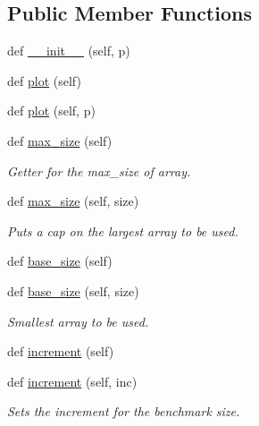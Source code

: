 \subsection*{Public Member Functions}
\begin{DoxyCompactItemize}
\item 
def \hyperlink{classbridges_1_1sorting__benchmark_1_1_sorting_benchmark_a703f01c41d21cf5127eeff8918a4adbd}{\+\_\+\+\_\+init\+\_\+\+\_\+} (self, p)
\item 
def \hyperlink{classbridges_1_1sorting__benchmark_1_1_sorting_benchmark_a2cc8cc19c22027fc9b53d2fc13e47a0a}{plot} (self)
\item 
def \hyperlink{classbridges_1_1sorting__benchmark_1_1_sorting_benchmark_a39a40658212ca6ecb39870b6ec135e37}{plot} (self, p)
\item 
def \hyperlink{classbridges_1_1sorting__benchmark_1_1_sorting_benchmark_a14ce3cee6cd2a7233b894abb32cebc06}{max\+\_\+size} (self)
\begin{DoxyCompactList}\small\item\em Getter for the max\+\_\+size of array. \end{DoxyCompactList}\item 
def \hyperlink{classbridges_1_1sorting__benchmark_1_1_sorting_benchmark_ac315d63ef7b22cf5b4835663bd1cf809}{max\+\_\+size} (self, size)
\begin{DoxyCompactList}\small\item\em Puts a cap on the largest array to be used. \end{DoxyCompactList}\item 
def \hyperlink{classbridges_1_1sorting__benchmark_1_1_sorting_benchmark_a77d0f3d1afe635237de0353c372fadea}{base\+\_\+size} (self)
\item 
def \hyperlink{classbridges_1_1sorting__benchmark_1_1_sorting_benchmark_a14aeb9e7fe1b8ca6b9fabc83e68caa6b}{base\+\_\+size} (self, size)
\begin{DoxyCompactList}\small\item\em Smallest array to be used. \end{DoxyCompactList}\item 
def \hyperlink{classbridges_1_1sorting__benchmark_1_1_sorting_benchmark_a13b121b5fdecf989544638a94d6498d8}{increment} (self)
\item 
def \hyperlink{classbridges_1_1sorting__benchmark_1_1_sorting_benchmark_a3a2f43cd8fdb9f5ca88bd0ac9e6d0e2e}{increment} (self, inc)
\begin{DoxyCompactList}\small\item\em Sets the increment for the benchmark size. \end{DoxyCompactList}\item 

\end{DoxyCompactItemize}
